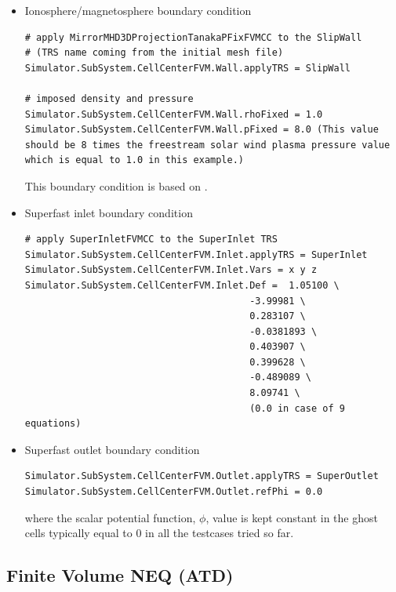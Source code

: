 \documentclass[11pt]{article}
\begin{document}
\begin{itemize}
\item
Ionosphere/magnetosphere boundary condition \cite{phd:yalim, yalim11jgr}

\begin{lstlisting}[breaklines]
# apply MirrorMHD3DProjectionTanakaPFixFVMCC to the SlipWall 
# (TRS name coming from the initial mesh file)
Simulator.SubSystem.CellCenterFVM.Wall.applyTRS = SlipWall

# imposed density and pressure 
Simulator.SubSystem.CellCenterFVM.Wall.rhoFixed = 1.0
Simulator.SubSystem.CellCenterFVM.Wall.pFixed = 8.0 (This value should be 8 times the freestream solar wind plasma pressure value which is equal to 1.0 in this example.) 
\end{lstlisting}
This boundary condition is based on \cite{powell99}.
\item
Superfast inlet boundary condition \cite{yalim08, phd:yalim, yalim11jcp, yalim11jgr}

\begin{lstlisting}[breaklines]
# apply SuperInletFVMCC to the SuperInlet TRS 
Simulator.SubSystem.CellCenterFVM.Inlet.applyTRS = SuperInlet
Simulator.SubSystem.CellCenterFVM.Inlet.Vars = x y z
Simulator.SubSystem.CellCenterFVM.Inlet.Def =  1.05100 \
                                        -3.99981 \
                                        0.283107 \
                                        -0.0381893 \
                                        0.403907 \
                                        0.399628 \
                                        -0.489089 \
                                        8.09741 \
                                        (0.0 in case of 9 equations)
\end{lstlisting}

\item
Superfast outlet boundary condition \cite{yalim08, phd:yalim, yalim11jcp, yalim11jgr}

\begin{lstlisting}[breaklines]
Simulator.SubSystem.CellCenterFVM.Outlet.applyTRS = SuperOutlet
Simulator.SubSystem.CellCenterFVM.Outlet.refPhi = 0.0
\end{lstlisting}
where the scalar potential function, $\phi$, value is kept constant in the ghost cells typically equal to 0 in all the testcases tried so far.
\end{itemize}

\subsection{Finite Volume NEQ (ATD)}
\end{document}
